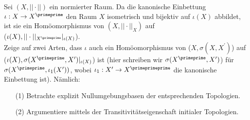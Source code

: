 \begin{exercise}
Sei $(X,||\cdot||)$ ein normierter Raum. Da die kanonische Einbettung $\iota: X
\rightarrow X^{\primeprime}$ den Raum $X$ isometrisch und bijektiv auf $\iota(X)$
abbildet, ist sie ein Homöomorphismus von $(X,||\cdot||_X)$ auf \\
($\iota(X),||\cdot||_{X^{\primeprime}}|_{\iota(X)}$). \\
Zeige auf zwei Arten, dass $\iota$ auch ein Homöomorphismus von ($X,\sigma(X,X^{\prime})$)
auf ($\iota(X),\sigma(X^{\primeprime},X^{\prime})|_{\iota(X)}$) ist (hier schreiben wir
$\sigma(X^{\primeprime},X^{\prime})$) für $\sigma(X^{\primeprime},\iota_1(X^{\prime}))$,
wobei $\iota_1: X^{\prime} \rightarrow X^{\primeprimeprime}$ die kanonische Einbettung ist).
Nämlich:
\begin{itemize}
  \item [(1)] Betrachte explizit Nullumgebungsbasen der entsprechenden Topologien.
  \item [(2)] Argumentiere mittels der Transitivitätseigenschaft initialer Topologien.
\end{itemize}
\end{exercise}

